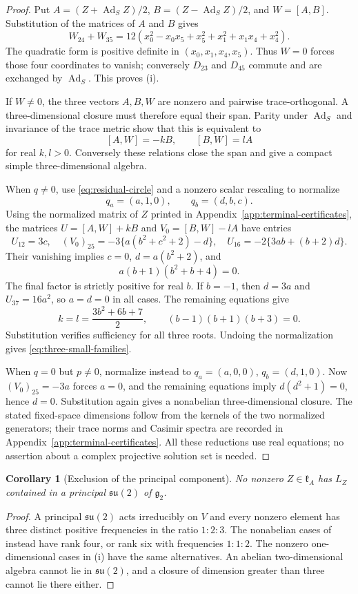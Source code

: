 \documentclass[11pt,a4paper]{article}
\newtheorem{corollary}[corollary]{Corollary}
\newcommand{\Ad}{\operatorname{Ad}}
\begin{document}
\begin{proof}
Put $A=(Z+\Ad_SZ)/2$, $B=(Z-\Ad_SZ)/2$, and $W=[A,B]$.  Substitution of the matrices of $A$ and $B$ gives
\[
 W_{24}+W_{35}=12(x_0^2-x_0x_5+x_5^2+x_1^2+x_1x_4+x_4^2).
\]
The quadratic form is positive definite in $(x_0,x_1,x_4,x_5)$.  Thus $W=0$ forces those four coordinates to vanish; conversely $D_{23}$ and $D_{45}$ commute and are exchanged by $\Ad_S$.  This proves (i).

If $W\ne0$, the three vectors $A,B,W$ are nonzero and pairwise trace-orthogonal.  A three-dimensional closure must therefore equal their span.  Parity under $\Ad_S$ and invariance of the trace metric show that this is equivalent to
\[
[A,W]=-kB,\qquad [B,W]=lA
\]
for real $k,l>0$.  Conversely these relations close the span and give a compact simple three-dimensional algebra.

When $q\ne0$, use \eqref{eq:residual-circle} and a nonzero scalar rescaling to normalize
\[
 q_a=(a,1,0),\qquad q_b=(d,b,c).
\]
Using the normalized matrix of $Z$ printed in Appendix~\ref{app:terminal-certificates}, the matrices $U=[A,W]+kB$ and $V_0=[B,W]-lA$ have entries
\[
 U_{12}=3c,\quad (V_0)_{25}=-3\{a(b^2+c^2+2)-d\},\quad
 U_{16}=-2\{3ab+(b+2)d\}.
\]
Their vanishing implies $c=0$, $d=a(b^2+2)$, and
\[
 a(b+1)(b^2+b+4)=0.
\]
The final factor is strictly positive for real $b$.  If $b=-1$, then $d=3a$ and $U_{37}=16a^2$, so $a=d=0$ in all cases.  The remaining equations give
\[
 k=l=\frac{3b^2+6b+7}{2},\qquad (b-1)(b+1)(b+3)=0.
\]
Substitution verifies sufficiency for all three roots.  Undoing the normalization gives \eqref{eq:three-small-families}.

When $q=0$ but $p\ne0$, normalize instead to $q_a=(a,0,0)$, $q_b=(d,1,0)$.  Now $(V_0)_{25}=-3a$ forces $a=0$, and the remaining equations imply $d(d^2+1)=0$, hence $d=0$.  Substitution again gives a nonabelian three-dimensional closure.  The stated fixed-space dimensions follow from the kernels of the two normalized generators; their trace norms and Casimir spectra are recorded in Appendix~\ref{app:terminal-certificates}.  All these reductions use real equations; no assertion about a complex projective solution set is needed.
\end{proof}

\begin{corollary}[Exclusion of the principal component]
\label{cor:no-principal}
No nonzero $Z\in\mathfrak k_A$ has $L_Z$ contained in a principal $\mathfrak{su}(2)$ of $\mathfrak g_2$.
\end{corollary}
\begin{proof}
A principal $\mathfrak{su}(2)$ acts irreducibly on $V$ and every nonzero element has three distinct positive frequencies in the ratio $1:2:3$.  The nonabelian cases of  instead have rank four, or rank six with frequencies $1:1:2$.  The nonzero one-dimensional cases in (i) have the same alternatives.  An abelian two-dimensional algebra cannot lie in $\mathfrak{su}(2)$, and a closure of dimension greater than three cannot lie there either.
\end{proof}
\end{document}
